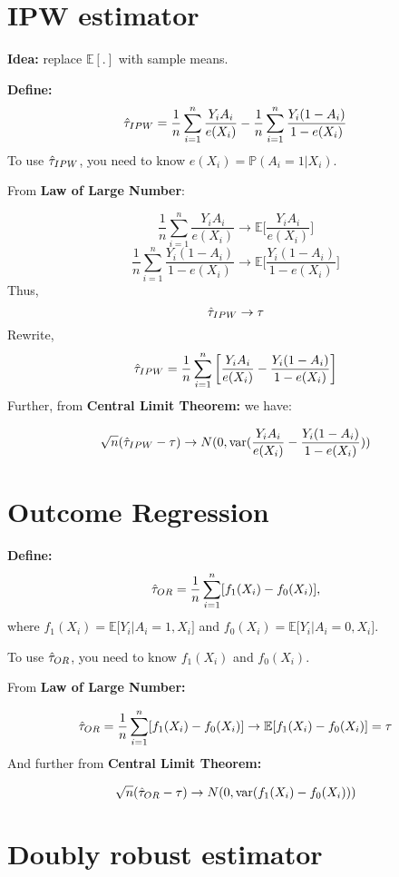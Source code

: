\documentclass[
]{book}
\begin{document}
\hypertarget{ipw-estimator}{%
\section{IPW estimator}\label{ipw-estimator}}

\textbf{Idea:} replace \(\mathbb{E}[.]\) with sample means.

\textbf{Define:}
\[\hat{\Large\tau}_{IPW} = \frac{1}{n} \sum_{i=1}^{n}\frac{Y_iA_i}{e(X_i)} - \frac{1}{n} \sum_{i=1}^{n}\frac{Y_i(1-A_i)}{1-e(X_i)}\]
To use \(\hat{\Large\tau}_{IPW}\), you need to know \(e(X_i) = \mathbb{P}(A_i=1 |X_i)\).

From \textbf{Law of Large Number}:

\[\frac{1}{n} \sum_{i=1}^{n}\frac{Y_iA_i}{e(X_i)} \rightarrow \mathbb{E} \big[\frac{Y_iA_i}{e(X_i)} \big]\]
\[\frac{1}{n} \sum_{i=1}^{n}\frac{Y_i(1-A_i)}{1-e(X_i)} \rightarrow \mathbb{E} \big[\frac{Y_i(1-A_i)}{1-e(X_i)} \big]\]
Thus,
\[\hat{\Large\tau}_{IPW} \rightarrow \Large\tau\]
Rewrite,
\[\hat{\Large\tau}_{IPW} = \frac{1}{n} \sum_{i=1}^{n}\bigg [\frac{Y_iA_i}{e(X_i)} - \frac{Y_i(1-A_i)}{1-e(X_i)} \bigg ]\]
Further, from \textbf{Central Limit Theorem:} we have:

\[\sqrt{n}(\hat{\Large\tau}_{IPW} - {\Large \tau}) \rightarrow N(0, \text{var}(\frac{Y_iA_i}{e(X_i)} - \frac{Y_i(1-A_i)}{1-e(X_i)}))\]

\hypertarget{outcome-regression}{%
\section{Outcome Regression}\label{outcome-regression}}

\textbf{Define:}
\[\hat{\Large\tau}_{OR} = \frac{1}{n}\sum_{i=1}^{n} [f_1(X_i) - f_0(X_i)],\]
where \(f_1(X_i) = \mathbb{E} \big[ Y_i|A_i=1,X_i\big]\) and \(f_0(X_i) = \mathbb{E} \big[ Y_i|A_i=0,X_i\big]\).

To use \(\hat{\Large\tau}_{OR}\), you need to know \(f_1(X_i)\) and \(f_0(X_i)\).

From \textbf{Law of Large Number:}

\[\hat{\Large\tau}_{OR}= \frac{1}{n}\sum_{i=1}^{n} [f_1(X_i) - f_0(X_i)] \rightarrow \mathbb{E}[f_1(X_i) - f_0(X_i)] = {\Large\tau}\]
And further from \textbf{Central Limit Theorem:}

\[\sqrt{n}(\hat{\Large\tau}_{OR} - {\Large \tau}) \rightarrow N(0, \text{var}(f_1(X_i) - f_0(X_i)))\]

\hypertarget{doubly-robust-estimator}{%
\section{Doubly robust estimator}\label{doubly-robust-estimator}}
\end{document}
